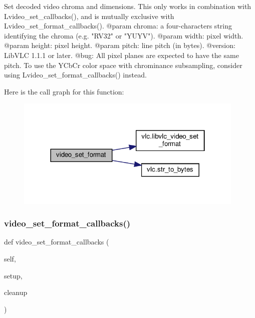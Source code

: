 \begin{DoxyVerb}Set decoded video chroma and dimensions.
This only works in combination with L{video_set_callbacks}(),
and is mutually exclusive with L{video_set_format_callbacks}().
@param chroma: a four-characters string identifying the chroma (e.g. "RV32" or "YUYV").
@param width: pixel width.
@param height: pixel height.
@param pitch: line pitch (in bytes).
@version: LibVLC 1.1.1 or later.
@bug: All pixel planes are expected to have the same pitch. To use the YCbCr color space with chrominance subsampling, consider using L{video_set_format_callbacks}() instead.
\end{DoxyVerb}
 Here is the call graph for this function\+:
\nopagebreak
\begin{figure}[H]
\begin{center}
\leavevmode
\includegraphics[width=310pt]{classvlc_1_1_media_player_aaa29bcd8c914e465dea43f8fc19fade4_cgraph}
\end{center}
\end{figure}
\mbox{\label{classvlc_1_1_media_player_a4e34ac0318b11492555047b9d271a8d6}} 
\subsubsection{\texorpdfstring{video\+\_\+set\+\_\+format\+\_\+callbacks()}{video\_set\_format\_callbacks()}}
{\footnotesize\ttfamily def video\+\_\+set\+\_\+format\+\_\+callbacks (\begin{DoxyParamCaption}\item[{}]{self,  }\item[{}]{setup,  }\item[{}]{cleanup }\end{DoxyParamCaption})}

